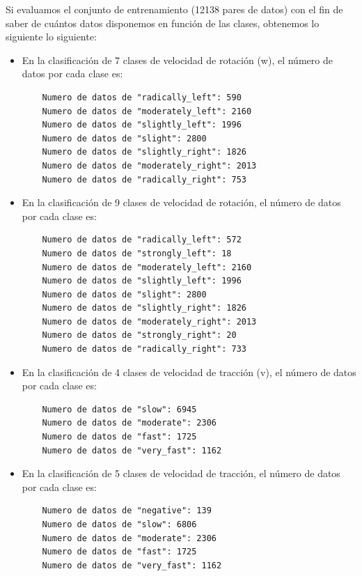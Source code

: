 Si evaluamos el conjunto de entrenamiento (12138 pares de datos) con el fin de saber de cuántos datos disponemos en función de las clases, obtenemos lo siguiente lo siguiente:\\

\begin{itemize}
    \item En la clasificación de 7 clases de velocidad de rotación (w), el número de datos por cada clase es:

    \vspace{10pt}
    \begin{lstlisting}
    Numero de datos de "radically_left": 590
    Numero de datos de "moderately_left": 2160
    Numero de datos de "slightly_left": 1996
    Numero de datos de "slight": 2800
    Numero de datos de "slightly_right": 1826
    Numero de datos de "moderately_right": 2013
    Numero de datos de "radically_right": 753
    \end{lstlisting}
    \vspace{20pt}


    \item En la clasificación de 9 clases de velocidad de rotación,  el número de datos por cada clase es:

    \vspace{10pt}
    \begin{lstlisting}
    Numero de datos de "radically_left": 572
    Numero de datos de "strongly_left": 18
    Numero de datos de "moderately_left": 2160
    Numero de datos de "slightly_left": 1996
    Numero de datos de "slight": 2800
    Numero de datos de "slightly_right": 1826
    Numero de datos de "moderately_right": 2013
    Numero de datos de "strongly_right": 20
    Numero de datos de "radically_right": 733
    \end{lstlisting}
    \vspace{20pt}


    \item En la clasificación de 4 clases de velocidad de tracción (v),  el número de datos por cada clase es:

    \vspace{10pt}
    \begin{lstlisting}
    Numero de datos de "slow": 6945
    Numero de datos de "moderate": 2306
    Numero de datos de "fast": 1725
    Numero de datos de "very_fast": 1162
    \end{lstlisting}
    \vspace{20pt}

    \item En la clasificación de 5 clases de velocidad de tracción,  el número de datos por cada clase es:

    \vspace{10pt}
    \begin{lstlisting}
    Numero de datos de "negative": 139
    Numero de datos de "slow": 6806
    Numero de datos de "moderate": 2306
    Numero de datos de "fast": 1725
    Numero de datos de "very_fast": 1162 
    \end{lstlisting}
    \vspace{20pt}

\end{itemize}


